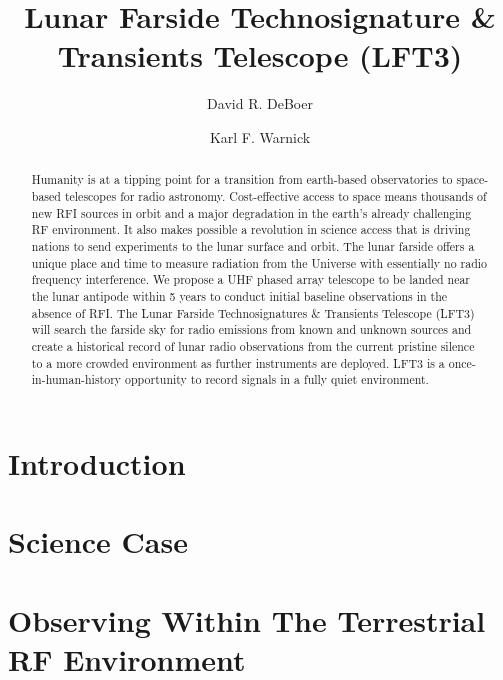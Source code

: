 \documentclass[preprint]{aastex631}
\begin{document}
\title{Lunar Farside Technosignature \& Transients Telescope (LFT3)}

\author[0000-0003-3197-2294]{David R. DeBoer}
\author[0000-0002-0387-6476]{Karl F. Warnick}



\begin{abstract}
Humanity is at a tipping point for a transition from earth-based observatories to space-based telescopes for radio astronomy. Cost-effective access to space means thousands of new RFI sources in orbit and a major degradation in the earth’s already challenging RF environment. It also makes possible a revolution in science access that is driving nations to send experiments to the lunar surface and orbit. The lunar farside offers a unique place and time to measure radiation from the Universe with essentially no radio frequency interference. We propose a UHF phased array telescope to be landed near the lunar antipode within 5 years to conduct initial baseline observations in the absence of RFI. The Lunar Farside Technosignatures \& Transients Telescope (LFT3) will search the farside sky for radio emissions from known and unknown sources and create a historical record of lunar radio observations from the current pristine silence to a more crowded environment as further instruments are deployed. LFT3 is a once-in-human-history opportunity to record signals in a fully quiet environment. 

\end{abstract}

\section{Introduction} 
\label{sec:intro}


\section{Science Case}
\label{sec:science}


\section{Observing Within The Terrestrial RF Environment}
\label{sec:rfenv}

\end{document}
